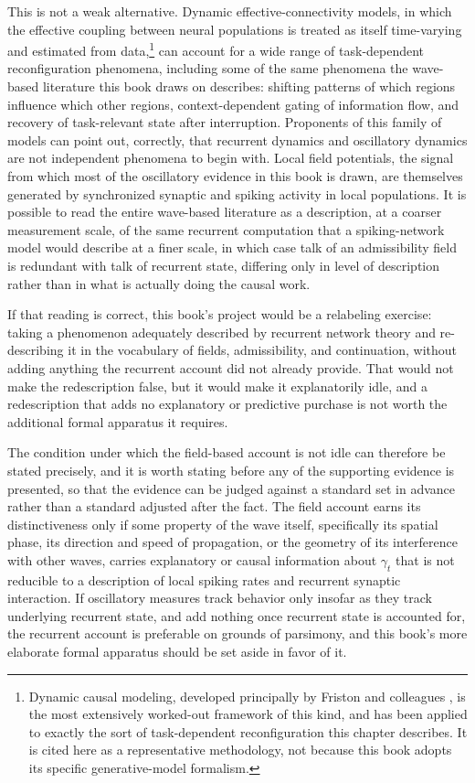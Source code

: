 \documentclass[11pt]{book}
\begin{document}
This is not a weak alternative. Dynamic effective-connectivity models, in which the effective coupling between neural populations is treated as itself time-varying and estimated from data,\footnote{Dynamic causal modeling, developed principally by Friston and colleagues \cite{friston2003}, is the most extensively worked-out framework of this kind, and has been applied to exactly the sort of task-dependent reconfiguration this chapter describes. It is cited here as a representative methodology, not because this book adopts its specific generative-model formalism.} can account for a wide range of task-dependent reconfiguration phenomena, including some of the same phenomena the wave-based literature this book draws on describes: shifting patterns of which regions influence which other regions, context-dependent gating of information flow, and recovery of task-relevant state after interruption. Proponents of this family of models can point out, correctly, that recurrent dynamics and oscillatory dynamics are not independent phenomena to begin with. Local field potentials, the signal from which most of the oscillatory evidence in this book is drawn, are themselves generated by synchronized synaptic and spiking activity in local populations. It is possible to read the entire wave-based literature as a description, at a coarser measurement scale, of the same recurrent computation that a spiking-network model would describe at a finer scale, in which case talk of an admissibility field is redundant with talk of recurrent state, differing only in level of description rather than in what is actually doing the causal work.

If that reading is correct, this book's project would be a relabeling exercise: taking a phenomenon adequately described by recurrent network theory and re-describing it in the vocabulary of fields, admissibility, and continuation, without adding anything the recurrent account did not already provide. That would not make the redescription false, but it would make it explanatorily idle, and a redescription that adds no explanatory or predictive purchase is not worth the additional formal apparatus it requires.

The condition under which the field-based account is not idle can therefore be stated precisely, and it is worth stating before any of the supporting evidence is presented, so that the evidence can be judged against a standard set in advance rather than a standard adjusted after the fact. The field account earns its distinctiveness only if some property of the wave itself, specifically its spatial phase, its direction and speed of propagation, or the geometry of its interference with other waves, carries explanatory or causal information about $\gamma_t$ that is not reducible to a description of local spiking rates and recurrent synaptic interaction. If oscillatory measures track behavior only insofar as they track underlying recurrent state, and add nothing once recurrent state is accounted for, the recurrent account is preferable on grounds of parsimony, and this book's more elaborate formal apparatus should be set aside in favor of it.
\end{document}
